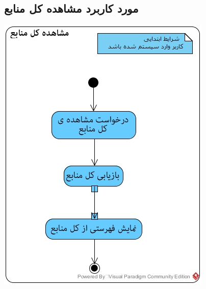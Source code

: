 \subsection*{مورد کاربرد مشاهده کل منابع}
\vspace{1cm}
\begin{center}
\includegraphics[width=\textwidth]{ActivityDiagrams/35.jpg}
\end{center}

\newpage
\vspace{1cm}
